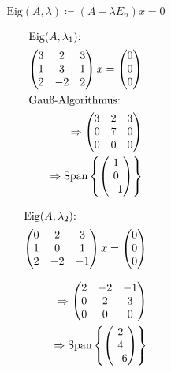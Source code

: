 \documentclass{HM}
\newcommand{\Eig}{\text{Eig}}
\newcommand{\Span}{\text{Span}}
\begin{document}
\begin{enumerate}
	$$\Eig(A,\lambda)\coloneqq (A-\lambda E_n)x=0$$
	\begin{minipage}{.33\textwidth}
		\begin{align*}
		\intertext{$\Eig(A, \lambda_1)$:}
		\begin{pmatrix}
			3&2&3\\
			1&3&1\\
			2&-2&2
		\end{pmatrix}x=\begin{pmatrix}
			0\\0\\0
		\end{pmatrix}\\
		\intertext{Gauß-Algorithmus:}
		\Rightarrow\begin{pmatrix}
			3&2&3\\
			0&7&0\\
			0&0&0
		\end{pmatrix}\\
		\Rightarrow\Span\left\lbrace\begin{pmatrix}
			1\\
			0\\
			-1
		\end{pmatrix}\right\rbrace
		\end{align*}
	\end{minipage}
	\begin{minipage}{.33\textwidth}
		\begin{align*}
		\intertext{$\Eig(A, \lambda_2)$:}
		\begin{pmatrix}
			0&2&3\\
			1&0&1\\
			2&-2&-1
		\end{pmatrix}x=\begin{pmatrix}
			0\\0\\0
		\end{pmatrix}\\
		\intertext{}
		\Rightarrow\begin{pmatrix}
			2&-2&-1\\
			0&2&3\\
			0&0&0
		\end{pmatrix}\\
		\Rightarrow\Span\left\lbrace\begin{pmatrix}
			2\\
			4\\
			-6
		\end{pmatrix}\right\rbrace
		\end{align*}

\end{minipage}
\end{enumerate}
\end{document}
